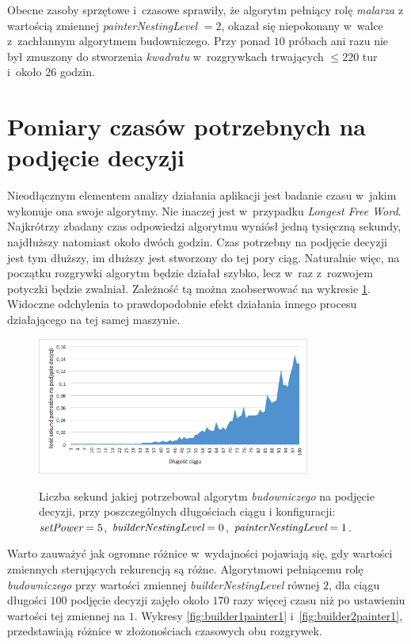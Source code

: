 \documentclass[document]{xmgr}
\begin{document}
Obecne zasoby sprzętowe i~czasowe sprawiły, że algorytm pełniący rolę \emph{malarza} z wartością zmiennej \emph{painterNestingLevel} $=2$, okazał się niepokonany w~walce z~zachłannym algorytmem budowniczego. Przy ponad $10$ próbach ani razu nie był zmuszony do stworzenia \emph{kwadratu} w~rozgrywkach trwających $\leq 220$ tur i~około 26 godzin.



\section{Pomiary czasów potrzebnych na podjęcie decyzji}
Nieodłącznym elementem analizy działania aplikacji jest badanie czasu w~jakim wykonuje ona swoje algorytmy. Nie inaczej jest w~przypadku \emph{Longest Free Word}. Najkrótrzy zbadany czas odpowiedzi algorytmu wyniósł jedną tysięczną sekundy, najdłuższy natomiast około dwóch godzin. Czas potrzebny na podjęcie decyzji jest tym dłuższy, im dłuższy jest stworzony do tej pory ciąg. Naturalnie więc, na początku rozgrywki algorytm będzie działał szybko, lecz w~raz z~rozwojem potyczki będzie zwalniał. Zależność tą można zaobserwować na wykresie \ref{fig:builder0painter1}. Widoczne odchylenia to prawdopodobnie efekt działania innego procesu działającego na tej samej maszynie.

\begin{figure}[tbh]
    \centering
    \caption{Liczba sekund jakiej potrzebował algorytm \emph{budowniczego} na podjęcie decyzji, przy poszczególnych długościach ciągu i konfiguracji: $\emph{setPower}=5$, $\emph{builderNestingLevel}=0$, $\emph{painterNestingLevel}=1$.}
    \includegraphics[width = 0.8\textwidth]{images2/timeBuilder0Painter1}
    \label{fig:builder0painter1}
\end{figure}

\newpage
Warto zauważyć jak ogromne różnice w~wydajności pojawiają się, gdy wartości zmiennych sterujących rekurencją są różne. Algorytmowi pełniącemu rolę \emph{budowniczego} przy wartości zmiennej \emph{builderNestingLevel} równej $2$, dla ciągu długości $100$ podjęcie decyzji zajęło około $170$ razy więcej czasu niż po ustawieniu wartości tej zmiennej na $1$. Wykresy \ref{fig:builder1painter1} i~\ref{fig:builder2painter1}, przedstawiają różnice w złożonościach czasowych obu rozgrywek.
\end{document}
